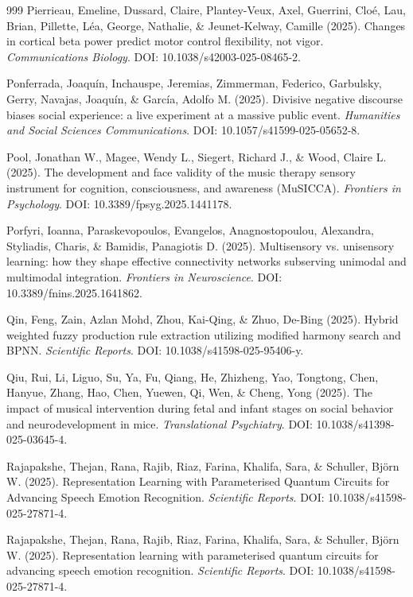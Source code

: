 \documentclass[9pt,onecolumn]{article}
\begin{document}
\begin{thebibliography}{999}
Pierrieau, Emeline, Dussard, Claire, Plantey-Veux, Axel, Guerrini, Cloé, Lau, Brian, Pillette, Léa, George, Nathalie, \& Jeunet-Kelway, Camille (2025). Changes in cortical beta power predict motor control flexibility, not vigor. \textit{Communications Biology}. DOI: 10.1038/s42003-025-08465-2.

Ponferrada, Joaquín, Inchauspe, Jeremias, Zimmerman, Federico, Garbulsky, Gerry, Navajas, Joaquín, \& García, Adolfo M. (2025). Divisive negative discourse biases social experience: a live experiment at a massive public event. \textit{Humanities and Social Sciences Communications}. DOI: 10.1057/s41599-025-05652-8.

Pool, Jonathan W., Magee, Wendy L., Siegert, Richard J., \& Wood, Claire L. (2025). The development and face validity of the music therapy sensory instrument for cognition, consciousness, and awareness (MuSICCA). \textit{Frontiers in Psychology}. DOI: 10.3389/fpsyg.2025.1441178.

Porfyri, Ioanna, Paraskevopoulos, Evangelos, Anagnostopoulou, Alexandra, Styliadis, Charis, \& Bamidis, Panagiotis D. (2025). Multisensory vs. unisensory learning: how they shape effective connectivity networks subserving unimodal and multimodal integration. \textit{Frontiers in Neuroscience}. DOI: 10.3389/fnins.2025.1641862.

Qin, Feng, Zain, Azlan Mohd, Zhou, Kai-Qing, \& Zhuo, De-Bing (2025). Hybrid weighted fuzzy production rule extraction utilizing modified harmony search and BPNN. \textit{Scientific Reports}. DOI: 10.1038/s41598-025-95406-y.

Qiu, Rui, Li, Liguo, Su, Ya, Fu, Qiang, He, Zhizheng, Yao, Tongtong, Chen, Hanyue, Zhang, Hao, Chen, Yuewen, Qi, Wen, \& Cheng, Yong (2025). The impact of musical intervention during fetal and infant stages on social behavior and neurodevelopment in mice. \textit{Translational Psychiatry}. DOI: 10.1038/s41398-025-03645-4.

Rajapakshe, Thejan, Rana, Rajib, Riaz, Farina, Khalifa, Sara, \& Schuller, Björn W. (2025). Representation Learning with Parameterised Quantum Circuits for Advancing Speech Emotion Recognition. \textit{Scientific Reports}. DOI: 10.1038/s41598-025-27871-4.

Rajapakshe, Thejan, Rana, Rajib, Riaz, Farina, Khalifa, Sara, \& Schuller, Björn W. (2025). Representation learning with parameterised quantum circuits for advancing speech emotion recognition. \textit{Scientific Reports}. DOI: 10.1038/s41598-025-27871-4.


\end{thebibliography}
\end{document}
